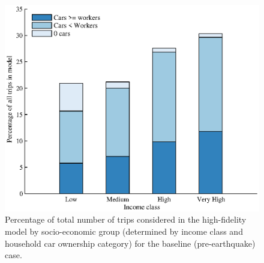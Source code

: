 \begin{figure}[h]
\centering
\includegraphics[width=6in]{FIGS/equity_dataset_count_bars.eps} 
\caption{Percentage of total number of trips considered in the high-fidelity model by socio-economic group (determined by income class and household car ownership category) for the baseline (pre-earthquake) case.}
\label{fig:car}
\end{figure}


 
